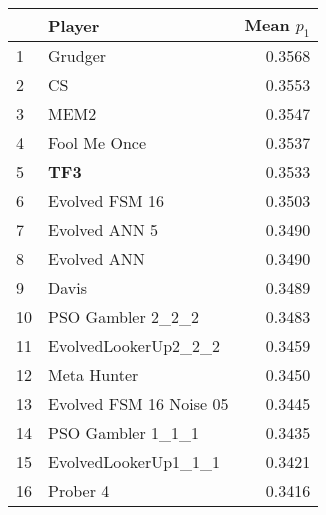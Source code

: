 \begin{tabular}{llr}
\toprule
{} &                   Player &  Mean $p_1$ \\
\midrule
1  &                  Grudger &      0.3568 \\
2  &                       CS &      0.3553 \\
3  &                     MEM2 &      0.3547 \\
4  &             Fool Me Once &      0.3537 \\
5  &                      \textbf{TF3} &      0.3533 \\
6  &           Evolved FSM 16 &      0.3503 \\
7  &            Evolved ANN 5 &      0.3490 \\
8  &              Evolved ANN &      0.3490 \\
9  &                    Davis &      0.3489 \\
10 &        PSO Gambler 2\_2\_2 &      0.3483 \\
11 &     EvolvedLookerUp2\_2\_2 &      0.3459 \\
12 &              Meta Hunter &      0.3450 \\
13 &  Evolved FSM 16 Noise 05 &      0.3445 \\
14 &        PSO Gambler 1\_1\_1 &      0.3435 \\
15 &     EvolvedLookerUp1\_1\_1 &      0.3421 \\
16 &                 Prober 4 &      0.3416 \\
\bottomrule
\end{tabular}
